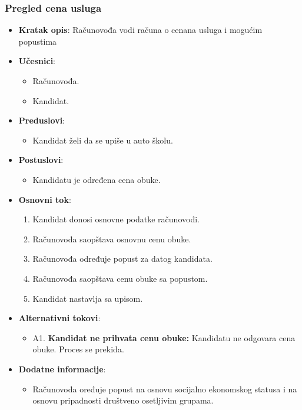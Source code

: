 \subsubsection{Pregled cena usluga}
\label{subsubsec:vozni park}
\begin{itemize}
  \item \textbf{Kratak opis}: Računovođa vodi računa o cenana usluga i mogućim popustima

  \item \textbf{Učesnici}:
    \begin{itemize}
    \item Računovođa.
    \item Kandidat.
    \end{itemize}
  \item \textbf{Preduslovi}:
    \begin{itemize}
    \item  Kandidat želi da se upiše u auto školu.
    \end{itemize}
  \item \textbf{Postuslovi}:
      \begin{itemize}
      \item  Kandidatu je određena cena obuke.
      \end{itemize}
  \item \textbf{Osnovni tok}:
      \begin{enumerate}
        \item Kandidat donosi osnovne podatke računovođi.
        \item Računovođa saopštava osnovnu cenu obuke.
        \item Računovođa određuje popust za datog kandidata.
        \item Računovođa saopštava cenu obuke sa popustom.
        \item Kandidat nastavlja sa upisom.
      \end{enumerate}

  \item \textbf{Alternativni tokovi}:
      \begin{itemize}
        \item A1. \textbf{Kandidat ne prihvata cenu obuke:}
        Kandidatu ne odgovara cena obuke. Proces se prekida.
      \end{itemize}

      
  \item \textbf{Dodatne informacije}:
      \begin{itemize}
        \item Računovođa oređuje popust na osnovu socijalno ekonomskog statusa i na osnovu pripadnosti društveno osetljivim grupama.
      \end{itemize}
\end{itemize}

